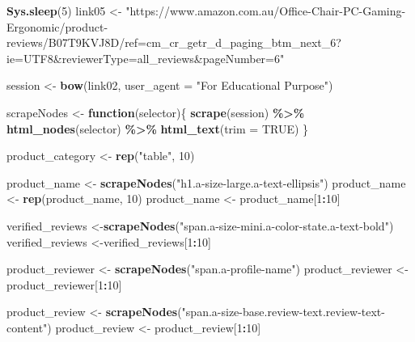 \documentclass[
]{article}
\newenvironment{Shaded}{\begin{snugshade}}{\end{snugshade}}
\newcommand{\AttributeTok}[1]{\textcolor[rgb]{0.13,0.29,0.53}{#1}}
\newcommand{\ConstantTok}[1]{\textcolor[rgb]{0.56,0.35,0.01}{#1}}
\newcommand{\ControlFlowTok}[1]{\textcolor[rgb]{0.13,0.29,0.53}{\textbf{#1}}}
\newcommand{\DecValTok}[1]{\textcolor[rgb]{0.00,0.00,0.81}{#1}}
\newcommand{\FunctionTok}[1]{\textcolor[rgb]{0.13,0.29,0.53}{\textbf{#1}}}
\newcommand{\NormalTok}[1]{#1}
\newcommand{\OtherTok}[1]{\textcolor[rgb]{0.56,0.35,0.01}{#1}}
\newcommand{\SpecialCharTok}[1]{\textcolor[rgb]{0.81,0.36,0.00}{\textbf{#1}}}
\newcommand{\StringTok}[1]{\textcolor[rgb]{0.31,0.60,0.02}{#1}}
\begin{document}
\begin{Shaded}
\begin{Highlighting}[]
   \FunctionTok{Sys.sleep}\NormalTok{(}\DecValTok{5}\NormalTok{)}
\NormalTok{link05 }\OtherTok{\textless{}{-}} \StringTok{"https://www.amazon.com.au/Office{-}Chair{-}PC{-}Gaming{-}Ergonomic/product{-}reviews/B07T9KVJ8D/ref=cm\_cr\_getr\_d\_paging\_btm\_next\_6?ie=UTF8\&reviewerType=all\_reviews\&pageNumber=6"}


\NormalTok{  session }\OtherTok{\textless{}{-}} \FunctionTok{bow}\NormalTok{(link02,}
               \AttributeTok{user\_agent =} \StringTok{"For Educational Purpose"}\NormalTok{)}

\NormalTok{  scrapeNodes }\OtherTok{\textless{}{-}} \ControlFlowTok{function}\NormalTok{(selector)\{}
    \FunctionTok{scrape}\NormalTok{(session) }\SpecialCharTok{\%\textgreater{}\%}
      \FunctionTok{html\_nodes}\NormalTok{(selector) }\SpecialCharTok{\%\textgreater{}\%}
      \FunctionTok{html\_text}\NormalTok{(}\AttributeTok{trim =} \ConstantTok{TRUE}\NormalTok{)}
\NormalTok{  \}}

\NormalTok{  product\_category }\OtherTok{\textless{}{-}} \FunctionTok{rep}\NormalTok{(}\StringTok{"table"}\NormalTok{, }\DecValTok{10}\NormalTok{)}

\NormalTok{  product\_name }\OtherTok{\textless{}{-}} \FunctionTok{scrapeNodes}\NormalTok{(}\StringTok{"h1.a{-}size{-}large.a{-}text{-}ellipsis"}\NormalTok{)}
\NormalTok{  product\_name }\OtherTok{\textless{}{-}} \FunctionTok{rep}\NormalTok{(product\_name, }\DecValTok{10}\NormalTok{)}
\NormalTok{  product\_name }\OtherTok{\textless{}{-}}\NormalTok{ product\_name[}\DecValTok{1}\SpecialCharTok{:}\DecValTok{10}\NormalTok{]}
  
\NormalTok{  verified\_reviews }\OtherTok{\textless{}{-}}\FunctionTok{scrapeNodes}\NormalTok{(}\StringTok{"span.a{-}size{-}mini.a{-}color{-}state.a{-}text{-}bold"}\NormalTok{)}
\NormalTok{  verified\_reviews }\OtherTok{\textless{}{-}}\NormalTok{verified\_reviews[}\DecValTok{1}\SpecialCharTok{:}\DecValTok{10}\NormalTok{]}
  
\NormalTok{  product\_reviewer }\OtherTok{\textless{}{-}} \FunctionTok{scrapeNodes}\NormalTok{(}\StringTok{"span.a{-}profile{-}name"}\NormalTok{)}
\NormalTok{  product\_reviewer }\OtherTok{\textless{}{-}}\NormalTok{ product\_reviewer[}\DecValTok{1}\SpecialCharTok{:}\DecValTok{10}\NormalTok{]}
  
\NormalTok{  product\_review }\OtherTok{\textless{}{-}} \FunctionTok{scrapeNodes}\NormalTok{(}\StringTok{"span.a{-}size{-}base.review{-}text.review{-}text{-}content"}\NormalTok{)}
\NormalTok{  product\_review }\OtherTok{\textless{}{-}}\NormalTok{ product\_review[}\DecValTok{1}\SpecialCharTok{:}\DecValTok{10}\NormalTok{]}
  

\end{Highlighting}
\end{Shaded}
\end{document}
